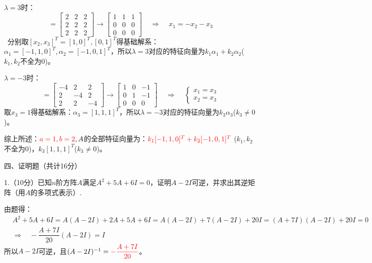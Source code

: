 \documentclass{article}
\begin{document}
\begin{jie}
$\lambda=3$时：
\begin{equation*}
[\lambda E-A]=
\begin{bmatrix}
  2 & 2&2 \\
  2 & 2 & 2\\
 2 & 2 &2
\end{bmatrix}\rightarrow
\begin{bmatrix}
  1 & 1&1 \\
  0 & 0 & 0\\
 0 & 0 &0
\end{bmatrix}~~~~~\Rightarrow~~~~~x_1=-x_2-x_3
\end{equation*}\
分别取$[x_2,x_3]^T=[1,0]^T,[0,1]^T$得基础解系：$\alpha_1=[-1,1,0]^T,\alpha_2=[-1,0,1]^T$，所以$\lambda=3$对应的特征向量为$k_1\alpha_1+k_2\alpha_2$($k_1,k_2$不全为0)。

$\lambda=-3$时：
\begin{equation*}
[\lambda E-A]=
\begin{bmatrix}
  -4 & 2&2 \\
  2 & -4 & 2\\
 2 & 2 &-4
\end{bmatrix}\rightarrow
\begin{bmatrix}
  1 & 0&-1 \\
  0 & 1 & -1\\
 0 & 0 &0
\end{bmatrix}~~~~~\Rightarrow~~~~~
\begin{cases}
x_1=x_3\\
x_2=x_3
\end{cases}
\end{equation*}
取$x_3=1$得基础解系：$\alpha_3=[1,1,1]^T$，所以$\lambda=-3$对应的特征向量为$k_3\alpha_3$($k_3\neq 0$)。

综上所述：$\textcolor[rgb]{1.00,0.00,0.00}{a=1,b=2},A$的全部特征向量为：$\textcolor[rgb]{1.00,0.00,0.00}{k_1[-1,1,0]^T+k_2[-1,0,1]^T}$ (\textcolor[rgb]{1.00,0.00,0.00}{$k_1,k_2$不全为0})，\textcolor[rgb]{1.00,0.00,0.00}{$k_3[1,1,1]^T$($k_3\neq 0$)}。
\end{jie}

四、证明题（共计16分）

1.（10分）已知$n$阶方阵$A$满足$A^2+5A+6I=0$，证明$A-2I$可逆，并求出其逆矩阵（用$A$的多项式表示）.

\begin{zhengming}
由题得：
\begin{align*}
&A^2+5A+6I=A(A-2I)+2A+5A+6I=A(A-2I)+7(A-2I)+20I=(A+7I)(A-2I)+20I=0\\
&\Rightarrow~~~~-\dfrac{A+7I}{20}(A-2I)=I
\end{align*}
所以$A-2I$可逆，且$(A-2I)^{-1}=\textcolor[rgb]{1.00,0.00,0.00}{-\dfrac{A+7I}{20}}$。
\end{zhengming}
\end{document}
